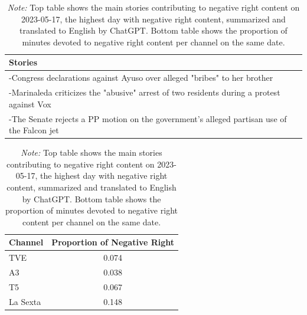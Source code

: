 \documentclass[12pt]{article}
\begin{document}
\begin{table}[!htb]
\caption{Top Stories for Negative Right and Outlet's Production}
\centering
\begin{tabular}{p{}}
	\toprule
	\textbf{Stories}  \\
	\midrule
	-Congress declarations against Ayuso over alleged "bribes" to her brother  \\
	-Marinaleda criticizes the "abusive" arrest of two residents during a protest against Vox  \\
	-The Senate rejects a PP motion on the government's alleged partisan use of the Falcon jet  \\
	\bottomrule
\end{tabular}
\begin{tabular}{l c}
	\toprule
	\textbf{Channel} & \textbf{Proportion of Negative Right} \\
	\midrule
	TVE & 0.074 \\
	A3  & 0.038 \\
	T5 & 0.067 \\
	La Sexta  & 0.148 \\
	\bottomrule
\end{tabular}


\caption*{\small  \textit{Note:} Top table shows the main stories contributing to negative right content on 2023-05-17, the highest day with negative right content,  summarized and translated to English by ChatGPT. Bottom table shows the proportion of minutes devoted to negative right content per channel on the same date. }

\label{tab:neg_right_channels}
\end{table}
\end{document}
